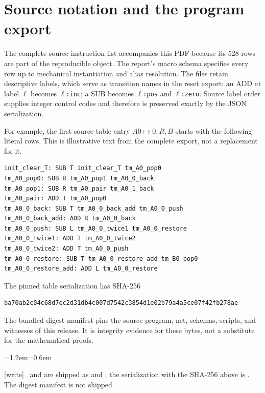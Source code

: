\documentclass[11pt,letterpaper]{article}
\theoremstyle{definition}
\theoremstyle{remark}
\newcommand{\rncode}[1]{\texttt{#1}}
\newcommand{\wtag}{\textup{[write]}}
\newenvironment{writenote}{\par\smallskip\begin{list}{}{\leftmargin=1.2em\rightmargin=0.6em}\item[]\small\wtag\ }{\end{list}\smallskip}
\begin{document}
\section{Source notation and the program export}
\label{qoc:rn:app:source}
The complete source instruction list accompanies this PDF because its 528 rows are part of the reproducible object. The report's macro schema specifies every row up to mechanical instantiation and alias resolution. The files retain descriptive labels, which serve as transition names in the reset export: an ADD at label $\ell$ becomes \rncode{\(\ell\):inc}; a SUB becomes \rncode{\(\ell\):pos} and \rncode{\(\ell\):zero}. Source label order supplies integer control codes and therefore is preserved exactly by the JSON serialization.

\noindent\begin{minipage}{\linewidth}
For example, the first source table entry $A0\mapsto0,R,B$ starts with the following literal rows. This is illustrative text from the complete export, not a replacement for it.
\begin{lstlisting}
init_clear_T: SUB T init_clear_T tm_A0_pop0
tm_A0_pop0: SUB R tm_A0_pop1 tm_A0_0_back
tm_A0_pop1: SUB R tm_A0_pair tm_A0_1_back
tm_A0_pair: ADD T tm_A0_pop0
tm_A0_0_back: SUB T tm_A0_0_back_add tm_A0_0_push
tm_A0_0_back_add: ADD R tm_A0_0_back
tm_A0_0_push: SUB L tm_A0_0_twice1 tm_A0_0_restore
tm_A0_0_twice1: ADD T tm_A0_0_twice2
tm_A0_0_twice2: ADD T tm_A0_0_push
tm_A0_0_restore: SUB T tm_A0_0_restore_add tm_B0_pop0
tm_A0_0_restore_add: ADD L tm_A0_0_restore
\end{lstlisting}
\end{minipage}
The pinned table serialization has SHA-256
\begin{lstlisting}
ba70ab2c04c68d7ec2d31db4c007d7542c3854d1e02b79a4a5ce07f42fb278ae
\end{lstlisting}
The bundled digest manifest pins the source program, net, schemas, scripts, and witnesses of this release. It is integrity evidence for these bytes, not a substitute for the mathematical proofs.

\begin{writenote}
 and  are shipped as  and ; the serialization with the SHA-256 above is . The digest manifest is not shipped.
\end{writenote}
\end{document}
